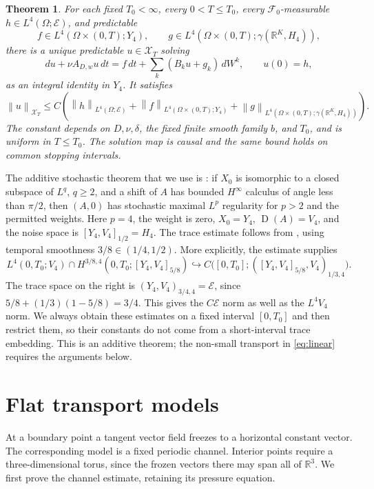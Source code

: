 \documentclass[11pt]{article}
\numberwithin{equation}{section}
\newtheorem{theorem}{Theorem}[section]
\theoremstyle{remark}
\newcommand{\R}{\mathbb R}
\newcommand{\calE}{\mathcal E}
\newcommand{\calX}{\mathcal X}
\newcommand{\norm}[1]{\left\lVert#1\right\rVert}
\DeclareMathOperator{\Dom}{D}
\begin{document}
\begin{theorem}\label{thm:linear}
For each fixed $T_0<\infty$, every $0<T\leq T_0$, every
$\mathcal F_0$-measurable $h\in L^4(\Omega;\calE)$, and predictable
\[
 f\in L^4(\Omega\times(0,T);Y_4),\qquad
 g\in L^4(\Omega\times(0,T);\gamma(\R^K,H_4)),
\]
there is a unique predictable $u\in\calX_T$ solving
\begin{equation}\label{eq:linear}
 du+\nu A_{D,w}u\,dt=f\,dt+\sum_k(B_ku+g_k)\,dW^k,
 \qquad u(0)=h,
\end{equation}
as an integral identity in $Y_4$. It satisfies
\begin{equation}\label{eq:linear-bound}
 \norm{u}_{\calX_T}\leq C\left(
 \norm{h}_{L^4(\Omega;\calE)}+
 \norm{f}_{L^4(\Omega\times(0,T);Y_4)}+
 \norm{g}_{L^4(\Omega\times(0,T);\gamma(\R^K,H_4))}\right).
\end{equation}
The constant depends on $D,\nu,\delta$, the fixed finite smooth family
$b$, and $T_0$, and is uniform in $T\leq T_0$. The solution map is
causal and the same bound holds on common stopping intervals.
\end{theorem}

The additive stochastic theorem that we use is
\cite[Theorem 3.14]{AV}: if $X_0$ is isomorphic to a closed subspace
of $L^q$, $q\geq2$, and a shift of $A$ has bounded $H^\infty$
calculus of angle less than $\pi/2$, then $(A,0)$ has stochastic
maximal $L^p$ regularity for $p>2$ and the permitted weights. Here
$p=4$, the weight is zero, $X_0=Y_4$, $\Dom(A)=V_4$, and the
noise space is $[Y_4,V_4]_{1/2}=H_4$. The trace estimate follows from
\cite[Proposition 2.1, Definitions 3.7--3.8]{AV}, using temporal
smoothness $3/8\in(1/4,1/2)$. More explicitly, the estimate supplies
\[
 L^4(0,T_0;V_4)\cap
 H^{3/8,4}(0,T_0;[Y_4,V_4]_{5/8})
 \hookrightarrow C\bigl([0,T_0];([Y_4,V_4]_{5/8},V_4)_{1/3,4}\bigr).
\]
The trace space on the right is $(Y_4,V_4)_{3/4,4}=\calE$, since
$5/8+(1/3)(1-5/8)=3/4$. This gives the $C\calE$ norm as well
as the $L^4V_4$ norm. We always obtain these estimates on a fixed
interval $[0,T_0]$ and then restrict them, so their constants do not
come from a short-interval trace embedding. This is an additive theorem;
the non-small transport in \eqref{eq:linear} requires the arguments below.

\section{Flat transport models}\label{sec:models}

At a boundary point a tangent vector field freezes to a horizontal
constant vector. The corresponding model is a fixed periodic channel.
Interior points require a three-dimensional torus, since the frozen
vectors there may span all of $\R^3$. We first prove the channel
estimate, retaining its pressure equation.
\end{document}
